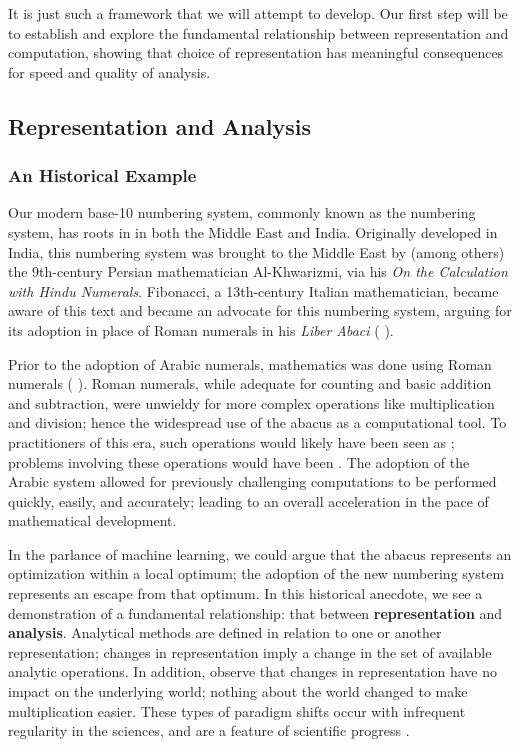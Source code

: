 It is just such a framework that we will attempt to develop.
Our first step will be to establish and explore the fundamental relationship between representation and computation, showing that choice of representation has meaningful consequences for speed and quality of analysis.

\subsection{Representation and Analysis}

\subsubsection{An Historical Example}

Our modern base-10 numbering system, commonly known as the  numbering system, has roots in in both the Middle East and India.
Originally developed in India, this numbering system was brought to the Middle East by (among others) the 9th-century Persian mathematician Al-Khwarizmi, via his \textit{On the Calculation with Hindu Numerals}.
Fibonacci, a 13th-century Italian mathematician, became aware of this text and became an advocate for this numbering system, arguing for its adoption in place of Roman numerals in his \textit{Liber Abaci} (\cite{ore} \cite{ferguson}).

Prior to the adoption of Arabic numerals, mathematics was done using Roman numerals (\cite{heilbroner} \cite{gowers}).
Roman numerals, while adequate for counting and basic addition and subtraction, were unwieldy for more complex operations like multiplication and division; hence the widespread use of the abacus as a computational tool.
To practitioners of this era, such operations would likely have been seen as ; problems involving these operations would have been .
The adoption of the Arabic system allowed for previously challenging computations to be performed quickly, easily, and accurately; leading to an overall acceleration in the pace of mathematical development.

In the parlance of machine learning, we could argue that the abacus represents an optimization within a local optimum; the adoption of the new numbering system represents an escape from that optimum.
In this historical anecdote, we see a demonstration of a fundamental relationship: that between \textbf{representation} and \textbf{analysis}.
Analytical methods are defined in relation to one or another representation; changes in representation imply a change in the set of available analytic operations.
In addition, observe that changes in representation have no impact on the underlying world; nothing about the world changed to make multiplication easier.
These types of paradigm shifts occur with infrequent regularity in the sciences, and are a feature of scientific progress \citep{kuhn}.

